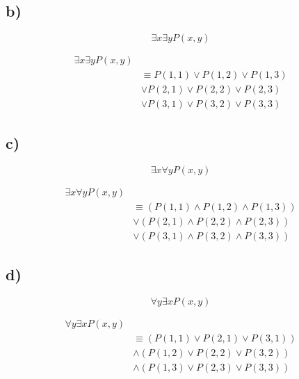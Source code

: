 \documentclass{article}
\begin{document}
\subsection{b)}
$$ \exists x \exists y P(x, y) $$

\begin{align*}
	\exists x \exists y P(x, y) & \\
	& \equiv P(1, 1) \lor P(1, 2) \lor P(1, 3) \\
	& \lor P(2, 1) \lor P(2, 2) \lor P(2, 3) \\
	& \lor P(3, 1) \lor P(3, 2) \lor P(3, 3)
\end{align*}

\subsection{c)}
$$ \exists x \forall y P(x, y) $$

\begin{align*}
	\exists x \forall y P(x, y) & \\
								& \equiv \left( P(1, 1) \land P(1, 2) \land P(1, 3) \right) \\
								& \lor \left( P(2, 1) \land P(2, 2) \land P(2, 3) \right) \\
								& \lor \left( P(3, 1) \land P(3, 2) \land P(3, 3) \right)
\end{align*}

\subsection{d)}
$$ \forall y \exists x P(x, y) $$

\begin{align*}
	\forall y \exists x P(x, y) & \\
								& \equiv \left( P(1, 1) \lor P(2, 1) \lor P(3, 1) \right) \\
								& \land \left( P(1, 2) \lor P(2, 2) \lor P(3, 2) \right) \\
								& \land \left( P(1, 3) \lor P(2, 3) \lor P(3, 3) \right)
\end{align*}
\end{document}
